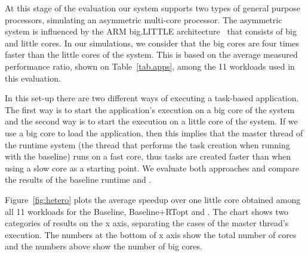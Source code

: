 At this stage of the evaluation our system supports two types of general purpose processors, simulating an asymmetric multi-core processor.
The asymmetric system is influenced by the ARM big.LITTLE architecture~\cite{ARM} that consists of big and little cores.
In our simulations, we consider that the big cores are four times faster than the little cores of the system.
This is based on the average measured performance ratio, shown on Table~\ref{tab.apps}, among the 11 workloads used in this evaluation.

In this set-up there are two different ways of executing a task-based application.
The first way is to start the application's execution on a big core of the system and the second way is to start the execution on a little core of the system.
If we use a big core to load the application, then this implies that the master thread of the runtime system (the thread that performs the task creation when running with the baseline) runs on a fast core, thus tasks are created faster than when using a slow core as a starting point.
We evaluate both approaches and compare the results of the baseline runtime and {\proposal}.

Figure~\ref{fig:hetero} plots the average speedup over one little core obtained among all 11 workloads for the Baseline, Baseline+RTopt and {\proposal}.
The chart shows two categories of results on the x axis, separating the cases of the master thread's execution.
The numbers at the bottom of x axis show the total number of cores and the numbers above show the number of big cores.


